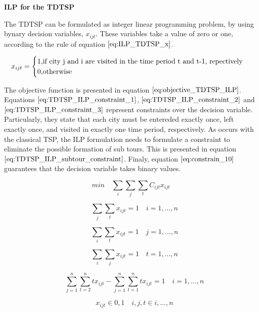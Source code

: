 \textbf{ILP for the TDTSP}

The TDTSP can be formulated as integer linear programming problem, by using bynary decision variables, $x_{ijt}$. These variables take a value of zero or one, according to the rule of equation $\ref{eq:ILP_TDTSP_x}$.

\begin{equation}
\label{eq:ILP_TDTSP_x}
	x_{ijt} =
	\begin{cases}
		1, $if city j and i are visited in the time period t and t-1, repectively$ \\
	    0, $otherwise$
	\end{cases}
\end{equation}

The objective function is presented in equation $\ref{eq:objective_TDTSP_ILP}$. Equations $\ref{eq:TDTSP_ILP_constraint_1}$, $\ref{eq:TDTSP_ILP_constraint_2}$ and $\ref{eq:TDTSP_ILP_constraint_3}$ represent constraints over the decision variable. Particularly, they state that each city must be entereded exactly once, left exactly once, and visited in exactly one time period, respectively. As occurs with the classical TSP, the ILP formulation needs to formulate a constraint to eliminate the possible formation of sub tours. This is presented in equation $\ref{eq:TDTSP_ILP_subtour_constraint}$. Finaly, equation $\ref{eq:constrain_10}$ guarantees that the decision variable takes binary values.

\begin{equation}
\label{eq:objective_TDTSP_ILP}
	min \quad \sum_{i}\sum_{j}\sum_{t} C_{ijt}x_{ijt}
\end{equation}

\begin{equation}
\label{eq:TDTSP_ILP_constraint_1}
	\quad \sum_{j}\sum_{t}x_{ijt} = 1 \quad i = 1, ... ,n
\end{equation}

\begin{equation}
\label{eq:TDTSP_ILP_constraint_2}
	\quad \sum_{i}\sum_{t}x_{ijt} = 1 \quad j = 1, ... ,n
\end{equation}

\begin{equation}
\label{eq:TDTSP_ILP_constraint_3}
	\quad \sum_{i}\sum_{j}x_{ijt} = 1 \quad t = 1, ... ,n
\end{equation}

\begin{equation}
\label{eq:TDTSP_ILP_subtour_constraint}
	\quad \sum_{j = 1}^{n}\sum_{t=2}^{n}tx_{ijt} - \sum_{j = 1}^{n}\sum_{t=1}^{n}tx_{ijt}  = 1 \quad i = 1, ... ,n
\end{equation}

\begin{equation} \label{eq:constrain_10}
\quad x_{ijt} \in {0, 1} \quad i,j, t \in {i,...,n}
\end{equation}

